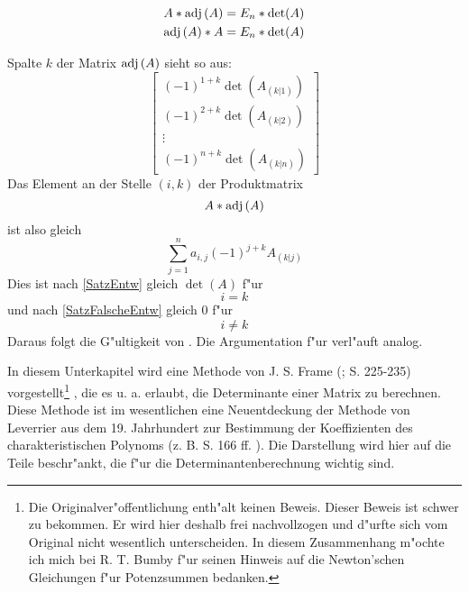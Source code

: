 \begin{satz}
\label{SatzAdj}
    \begin{eqnarray}
        \label{EquSatzAdj1}
        A * \mbox{\rm adj} \,(A) = E_n * \det(A) 
     \\ \label{EquSatzAdj2}
        \mbox{\rm adj} \,(A) * A = E_n * \det(A)
    \end{eqnarray}
\end{satz}
\begin{beweis}
    Spalte $k$ der Matrix $\mbox{\rm adj} \,(A)$ sieht so aus:
    \[ 
        \left[
        \begin{array}{c}
            (-1)^{1+k} \det(A_{(k|1)}) 
         \\ (-1)^{2+k} \det(A_{(k|2)})
         \\ \vdots
         \\ (-1)^{n+k} \det(A_{(k|n)})
        \end{array} 
        \right]
    \]
    Das Element an der Stelle $(i,k)$ der Produktmatrix \[ A * \mbox{\rm adj} \,(A) \]
    ist also gleich \[ \sum_{j=1}^n a_{i,j} (-1)^{j+k} A_{(k|j)} \]
    Dies ist nach \ref{SatzEntw} gleich $\det(A)$ f"ur \[ i = k \] und
    nach \ref{SatzFalscheEntw} gleich $0$ f"ur \[ i \neq k \]
    Daraus folgt die G"ultigkeit von . 
    Die Argumentation
    f"ur  verl"auft analog.
\end{beweis}


\label{SecFrame}

In diesem Unterkapitel wird eine Methode von J. S. Frame (\cite{Fram49};
\cite{Dwye51} S. 225-235) vorgestellt\footnote{ Die
Originalver"offentlichung \cite{Fram49} enth"alt keinen Beweis. Dieser
Beweis ist schwer zu bekommen. Er wird hier deshalb
frei nachvollzogen und d"urfte sich vom Original nicht wesentlich 
unterscheiden. In diesem Zusammenhang m"ochte ich mich bei R. T. Bumby 
f"ur seinen Hinweis auf die Newton'schen Gleichungen f"ur Potenzsummen
bedanken.} , die es u. a. erlaubt, die
Determinante einer Matrix zu berechnen. Diese Methode ist im wesentlichen
eine Neuentdeckung der 
Methode von Leverrier 
aus dem 19. Jahrhundert zur 
Bestimmung der Koeffizienten des charakteristischen Polynoms 
(z. B. \cite{Hous64} S. 166 ff. ). Die Darstellung wird hier auf die Teile 
beschr"ankt, die f"ur die Determinantenberechnung wichtig sind.

